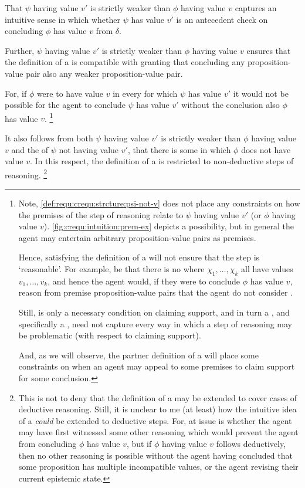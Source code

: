\begin{note}[Weaker]
  That \(\psi\) having value \(v'\) is strictly weaker than \(\phi\) having value \(v\) captures an intuitive sense in which whether \(\psi\) has value \(v'\) is an antecedent check on concluding \(\phi\) has value \(v\) from \(\delta\).

  Further, \(\psi\) having value \(v'\) is strictly weaker than \(\phi\) having value \(v\) ensures that the definition of a \crequ{} is compatible with granting that concluding any proposition-value pair also \indicateV{} any weaker proposition-value pair.

  For, if \(\phi\) were to have value \(v\) in every \epVW{} for which \(\psi\) has value \(v'\) it would not be possible for the agent to conclude \(\psi\) has value \(v'\) without the conclusion also \indicateV{} \(\phi\) has value \(v\).\nolinebreak
  \footnote{
    Note, \ref{def:requ:crequ:strcture:psi-not-v} does not place any constraints on how the premises of the step of reasoning relate to \(\psi\) having value \(v'\) (or \(\phi\) having value \(v\)).
    \autoref{fig:crequ:intuition:prem-ex} depicts a possibility, but in general the agent may entertain arbitrary proposition-value pairs as premises.

    Hence, satisfying the definition of a \crequ{} will not ensure that the step is `reasonable'.
    For example, be that there is no \epVW{} where \(\chi_{1},\dots,\chi_{k}\) all have values \(v_{1},\dots,v_{k}\), and hence the agent would, if they were to conclude \(\phi\) has value \(v\), reason from premise proposition-value pairs that the agent do not consider \epVAd{}.

    Still, \ideaCS{} is only a necessary condition on claiming support, and in turn a \requ{}, and specifically a \crequ{}, need not capture every way in which a step of reasoning may be problematic (with respect to claiming support).

    And, as we will observe, the partner definition of a \prequ{} will place some constraints on when an agent may appeal to some premises to claim support for some conclusion.
  }

  It also follows from both \(\psi\) having value \(v'\) is strictly weaker than \(\phi\) having value \(v\) and the \epVN{} of \(\psi\) not having value \(v'\), that there is some \epVW{} in which \(\phi\) does not have value \(v\).
  In this respect, the definition of a \crequ{} is restricted to non-deductive steps of reasoning.\nolinebreak
  \footnote{
    This is not to deny that the definition of a \requ{} may be extended to cover cases of deductive reasoning.
    Still, it is unclear to me (at least) how the intuitive idea of a \crequ{} \emph{could} be extended to deductive steps.
    For, at issue is whether the agent may have first witnessed some other reasoning which would prevent the agent from concluding \(\phi\) has value \(v\), but if \(\phi\) having value \(v\) follows deductively, then no other reasoning is possible without the agent having concluded that some proposition has multiple incompatible values, or the agent revising their current epistemic state.

}
\end{note}
